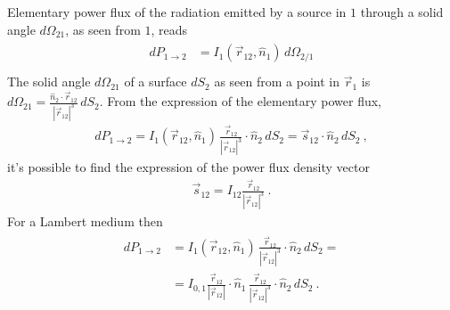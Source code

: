 \documentclass[letterpaper,10pt,english]{jupyterBook}
\begin{document}
\sphinxAtStartPar
Elementary power flux of the radiation emitted by a source in \(1\) through a solid angle \(d \Omega_{21}\), as seen from \(1\), reads
\begin{equation*}
\begin{split}\begin{aligned}
  d P_{1 \rightarrow 2}
  & = I_{1}(\vec{r}_{12}, \hat{n}_1) \, d \Omega_{2/1} \\
\end{aligned}\end{split}
\end{equation*}
\sphinxAtStartPar
The solid angle \(d \Omega_{21}\) of a surface \(d S_2\) as seen from a point in \(\vec{r}_1\) is \(d \Omega_{21} = \frac{\hat{n}_2 \cdot \vec{r}_{12}}{|\vec{r}_{12}|^3} \, dS_2\). From the expression of the elementary power flux,
\begin{equation*}
\begin{split}
 d P_{1 \rightarrow 2} = I_{1}(\vec{r}_{12}, \hat{n}_1) \, \frac{\vec{r}_{12} }{|\vec{r}_{12}|^3} \cdot \hat{n}_2 \, dS_2 = \vec{s}_{12} \cdot \hat{n}_2 \, dS_2 \ ,
\end{split}
\end{equation*}
\sphinxAtStartPar
it’s possible to find the expression of the power flux density vector
\begin{equation*}
\begin{split}\vec{s}_{12} = I_{12} \frac{\vec{r}_{12}}{|\vec{r}_{12}|^3} \ .\end{split}
\end{equation*}
\sphinxAtStartPar
For a Lambert medium then
\begin{equation}\label{equation:ch/heat-transfer-radiation:power-flux:radiant-intensity}
\begin{split}\begin{aligned}
 d P_{1 \rightarrow 2}
 & = I_{1}(\vec{r}_{12}, \hat{n}_1) \, \frac{\vec{r}_{12} }{|\vec{r}_{12}|^3} \cdot \hat{n}_2 \, dS_2 = \\
 & = I_{0,1} \frac{\vec{r}_{12}}{|\vec{r}_{12}|} \cdot \hat{n}_1 \, \frac{\vec{r}_{12} }{|\vec{r}_{12}|^3} \cdot \hat{n}_2 \, dS_2 \ .
\end{aligned}\end{split}
\end{equation}
\end{document}
